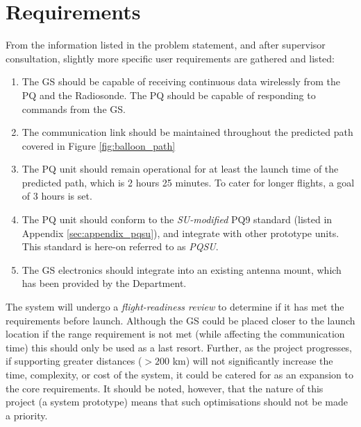 \section{Requirements}

From the information listed in the problem statement, and after supervisor consultation, slightly more specific user requirements are gathered and listed:
\begin{enumerate}
    \item The GS should be capable of receiving continuous data wirelessly from the PQ and the Radiosonde. The PQ should be capable of responding to commands from the GS.
    \item The communication link should be maintained throughout the predicted path covered in Figure \ref{fig:balloon_path}
    \item The PQ unit should remain operational for at least the launch time of the predicted path, which is 2 hours 25 minutes. To cater for longer flights, a goal of 3 hours is set.
    \item The PQ unit should conform to the \textit{SU-modified} PQ9 standard (listed in Appendix \ref{sec:appendix_pqsu}), and integrate with other prototype units. This standard is here-on referred to as \textit{PQSU}.
    \item The GS electronics should integrate into an existing antenna mount, which has been provided by the Department.
\end{enumerate}

The system will undergo a \textit{flight-readiness review} to determine if it has met the requirements before launch. Although the GS could be placed closer to the launch location if the range requirement is not met (while affecting the communication time) this should only be used as a last resort. Further, as the project progresses, if supporting greater distances ($> 200$ km) will not significantly increase the time, complexity, or cost of the system, it could be catered for as an expansion to the core requirements. It should be noted, however, that the nature of this project (a system prototype) means that such optimisations should not be made a priority.